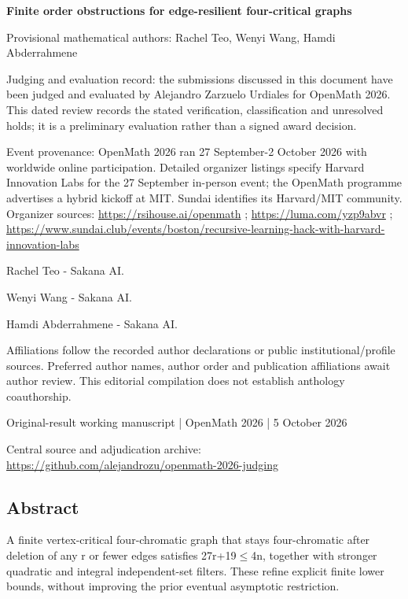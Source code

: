 \documentclass[11pt,a4paper]{article}
\begin{document}
{\LARGE\bfseries Finite order obstructions for edge-resilient four-critical graphs\par}\medskip
{\small Provisional mathematical authors: Rachel Teo, Wenyi Wang, Hamdi Abderrahmene\par}\medskip
{\small Judging and evaluation record: the submissions discussed in this document have been judged and evaluated by Alejandro Zarzuelo Urdiales for OpenMath 2026. This dated review records the stated verification, classification and unresolved holds; it is a preliminary evaluation rather than a signed award decision.\par}

{\small Event provenance: OpenMath 2026 ran 27 September-2 October 2026 with worldwide online participation. Detailed organizer listings specify Harvard Innovation Labs for the 27 September in-person event; the OpenMath programme advertises a hybrid kickoff at MIT. Sundai identifies its Harvard/MIT community. Organizer sources: \url{https://rsihouse.ai/openmath} ; \url{https://luma.com/yzp9abvr} ; \url{https://www.sundai.club/events/boston/recursive-learning-hack-with-harvard-innovation-labs}\par}

{\small Rachel Teo  -  Sakana AI.\par}

{\small Wenyi Wang  -  Sakana AI.\par}

{\small Hamdi Abderrahmene  -  Sakana AI.\par}

{\small Affiliations follow the recorded author declarations or public institutional/profile sources. Preferred author names, author order and publication affiliations await author review. This editorial compilation does not establish anthology coauthorship.\par}

{\small Original-result working manuscript | OpenMath 2026 | 5 October 2026\par}\medskip
{\small Central source and adjudication archive: \url{https://github.com/alejandrozu/openmath-2026-judging}\par}

\subsection{Abstract}
A finite vertex-critical four-chromatic graph that stays four-chromatic after deletion of any r or fewer edges satisfies 27r+19\ensuremath{\leq}4n, together with stronger quadratic and integral independent-set filters. These refine explicit finite lower bounds, without improving the prior eventual asymptotic restriction.
\end{document}
